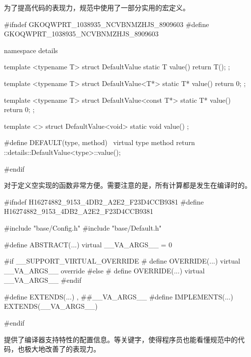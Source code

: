 \begin{content}

为了提高代码的表现力，规范中使用了一部分实用的宏定义。

\begin{leftbar}
\begin{c++}[caption={base/Default.h}]
#ifndef GKOQWPRT_1038935_NCVBNMZHJS_8909603
#define GKOQWPRT_1038935_NCVBNMZHJS_8909603

namespace details
{
   template <typename T>
   struct DefaultValue
   {
      static T value()
      {
         return T();
      }
   };

   template <typename T>
   struct DefaultValue<T*>
   {
       static T* value()
       {
           return 0;
       }
   };

   template <typename T>
   struct DefaultValue<const T*>
   {
       static T* value()
       {
           return 0;
       }
   };

   template <>
   struct DefaultValue<void>
   {
      static void value()
      {
      }
   };
}

#define DEFAULT(type, method)  \
    virtual type method { return ::details::DefaultValue<type>::value(); }

#endif
\end{c++}
\end{leftbar}

对于定义空实现的函数非常方便。需要注意的是，所有计算都是发生在编译时的。

\begin{leftbar}
\begin{c++}[caption={base/Keywords.h}]
#ifndef H16274882_9153_4DB2_A2E2_F23D4CCB9381
#define H16274882_9153_4DB2_A2E2_F23D4CCB9381

#include "base/Config.h"
#include "base/Default.h"

#define ABSTRACT(...) virtual __VA_ARGS__ = 0

#if __SUPPORT_VIRTUAL_OVERRIDE
#   define OVERRIDE(...) virtual __VA_ARGS__ override
#else
#   define OVERRIDE(...) virtual __VA_ARGS__
#endif

#define EXTENDS(...) , ##__VA_ARGS__
#define IMPLEMENTS(...) EXTENDS(__VA_ARGS__)

#endif
\end{c++}
\end{leftbar}

提供了编译器支持\cpp{}特性的配置信息。等关键字，使得程序员也能看懂规范中\cpp{}的代码，也极大地改善了\cpp{}的表现力。


\end{content}
